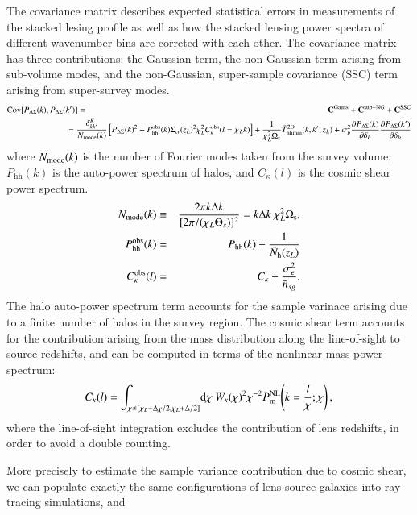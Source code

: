 \documentclass[onecolumn,notitlepage,showpacs,amsmath,amssymb,prd,floatfix]{revtex4-1}
\newcommand{\dr}{\mathrm{d}}
\newcommand{\phh}{P_{\mathrm{hh}}}
\newcommand{\bh}{\mathrm{h}}
\newcommand{\sigmacr}{\Sigma_{\rm cr}}
\newcommand{\dsigma}{\Delta\Sigma}
\begin{document}
The covariance matrix describes expected statistical
errors in measurements of the stacked lesing profile as well as how the
stacked lensing power spectra of different wavenumber bins are correted
with each other. The covariance matrix has three contributions: the
Gaussian term, the non-Gaussian term arising from sub-volume modes, and
the non-Gaussian, super-sample covariance (SSC) term arising from
super-survey modes.
%
\begin{eqnarray}
 {\rm Cov}[P_{\dsigma}(k),P_{\dsigma}(k')]&=&{\bf C}^{\rm Gauss}
  +{\bf C}^{\rm sub-NG}
  +{\bf C}^{\rm SSC}\nonumber\\
  &&\hspace{-3em}=
  \frac{\delta_{kk'}^K}{N_{\rm mode}(k)}
\left[P_{\dsigma}(k)^2
 +P^{\rm obs}_{\mathrm{hh}}(k)\sigmacr(z_L)^2\chi_L^2C_{\kappa}^{\rm
 obs}(l=\chi_L k)\right]
 +\frac{1}{\chi_L^2\Omega_{\rm s}}\bar{T}^{\rm
 2D}_{\mathrm{hhmm}}(k,k';z_L)
 +\sigma_b^2\frac{\partial P_{\dsigma}(k)}{\partial \delta_b}
 \frac{\partial P_{\dsigma}(k')}{\partial \delta_b}
\end{eqnarray}
%
where $N_{\rm mode}(k)$ is the number of Fourier modes taken from the
survey volume, $\phh(k)$ is the auto-power spectrum of halos, and
$C_\kappa(l)$ is the cosmic shear power spectrum.
%
\begin{eqnarray}
 N_{\rm mode}(k)&\equiv& \frac{2\pi k\Delta
  k}{[2\pi/(\chi_L\Theta_s)]^2}=k\Delta k~ \chi_L^2\Omega_{\rm
  s},\nonumber\\
 \phh^{\rm obs}(k)&=&\phh(k)+\frac{1}{\bar{N}_\bh(z_L)}\nonumber\\
 C^{\rm obs}_\kappa(l)&=&C_{\kappa}+\frac{\sigma_\epsilon^2}{\bar{n}_{sg}}.
\end{eqnarray}
%
The halo auto-power spectrum term accounts for the sample varinace
arising due to a finite number of halos in the survey region. The cosmic
shear term accounts for the contribution arising from the mass
distribution along the line-of-sight to source redshifts, and can be
computed in terms of the nonlinear mass power spectrum:
%
\begin{equation}
C_\kappa(l)=\int_{\chi\neq
 [\chi_L-\Delta\chi/2,\chi_L+\Delta/2]}\!\dr\chi~W_\kappa(\chi)^2\chi^{-2}
 P^{\rm NL}_{\rm m}\!\left(k=\frac{l}{\chi}; \chi\right), 
\end{equation}
%
where the line-of-sight integration excludes the contribution of lens
redshifts, in order to avoid a double counting. 

More precisely to estimate the sample variance contribution due to
cosmic shear, we can populate exactly the same configurations of
lens-source galaxies into ray-tracing simulations, and
\end{document}
